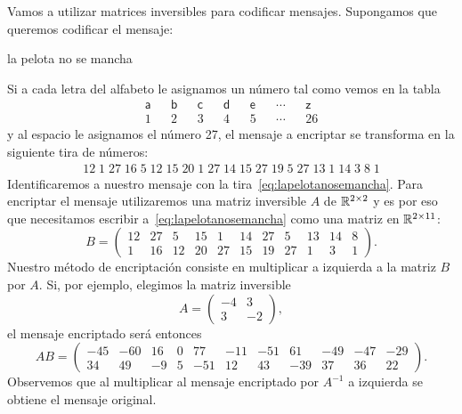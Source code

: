 \begin{block}%
    Vamos a utilizar matrices inversibles para codificar mensajes.  Supongamos
    que queremos codificar el mensaje:
    \begin{center}
        \textsf{la pelota no se mancha}
    \end{center}
    Si a cada letra del alfabeto le asignamos un número tal como vemos en la tabla 
    \begin{align*}
        \textsf{a} && \textsf{b} && \textsf{c} && \textsf{d} && \textsf{e} && \cdots && \textsf{z}\\
        1 && 2 && 3 && 4 && 5 && \cdots && 26
    \end{align*}
    y al espacio le asignamos el número 27, el mensaje a encriptar se
    transforma en la siguiente tira de números:
    \begin{align}
        \label{eq:lapelotanosemancha}
        12 \; 1 \; 27 \; 16 \; 5 \; 12 \; 15 \; 20 \; 1 \; 27 \; 14 \; 15 \; 27 \; 19 \; 5 \; 27 \; 13 \; 1 \; 14 \; 3 \; 8 \; 1
    \end{align}
    Identificaremos a nuestro mensaje con la tira~\eqref{eq:lapelotanosemancha}.
    Para encriptar el mensaje utilizaremos una matriz inversible $A$ de
    $\mathbb{R}^{2\times2}$ y es por eso que necesitamos escribir
    a~\eqref{eq:lapelotanosemancha} como una matriz en $\mathbb{R}^{2\times 11}$:
    \[
    B=\left(\begin{array}{ccccccccccc}
        12 & 27 &  5 & 15 &  1 & 14 & 27 &  5 & 13 & 14 & 8\\
         1 & 16 & 12 & 20 & 27 & 15 & 19 & 27 &  1 &  3 & 1
        \end{array}
        \right).
    \]
    Nuestro método de encriptación consiste en multiplicar a izquierda a la
    matriz $B$ por $A$. Si, por ejemplo, elegimos la matriz inversible 
    \[
    A=\begin{pmatrix}
        -4 & 3\\
        3 & -2
    \end{pmatrix},
    \]
    el mensaje encriptado será entonces
    \[
        AB=\left(\begin{array}{ccccccccccc}
        -45 & -60 & 16 & 0 & 77 & -11 & -51 & 61 & -49 & -47 & -29\\
         34 & 49 & -9 & 5 & -51 & 12 & 43 & -39 & 37 & 36 & 22
        \end{array}
        \right).
    \]
    Observemos que al multiplicar al mensaje encriptado por $A^{-1}$ a
    izquierda se obtiene el mensaje original.
\end{block}


